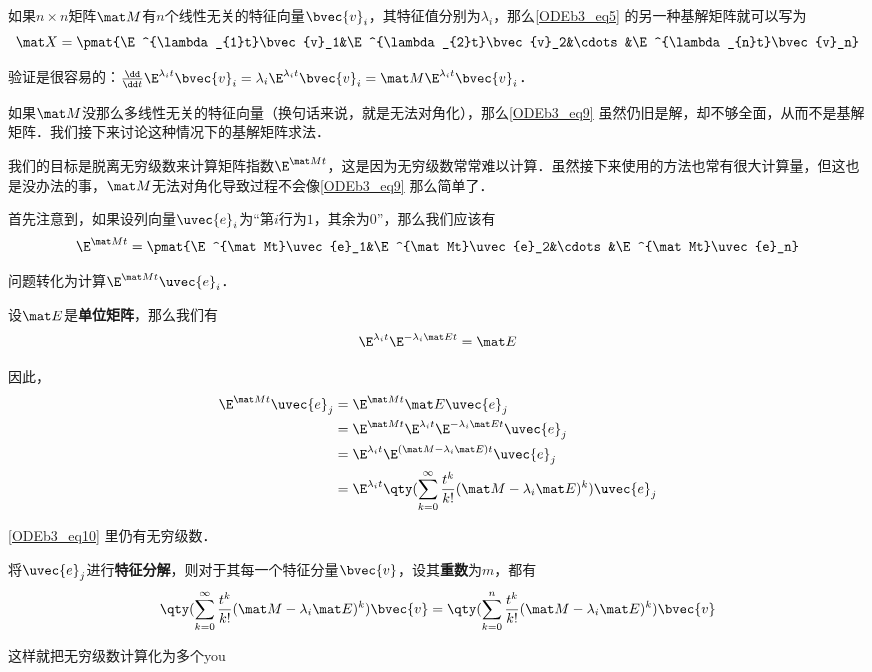 如果$n\times n$矩阵$\mat M$有$n$个线性无关的特征向量$\bvec{v}_i$，其特征值分别为$\lambda_i$，那么\autoref{ODEb3_eq5} 的另一种基解矩阵就可以写为
\begin{equation}\label{ODEb3_eq9}
\mat X=\pmat{\E^{\lambda_{1}t}\bvec{v}_1&\E^{\lambda_{2}t}\bvec{v}_2&\cdots&\E^{\lambda_{n}t}\bvec{v}_n}
\end{equation}

验证是很容易的：$\frac{\dd}{\dd t}\E^{\lambda_{i}t}\bvec{v}_i=\lambda_i\E^{\lambda_{i}t}\bvec{v}_i=\mat M\E^{\lambda_{i}t}\bvec{v}_i$．

如果$\mat M$没那么多线性无关的特征向量（换句话来说，就是无法对角化），那么\autoref{ODEb3_eq9} 虽然仍旧是解，却不够全面，从而不是基解矩阵．我们接下来讨论这种情况下的基解矩阵求法．

我们的目标是脱离无穷级数来计算矩阵指数$\E^{\mat Mt}$，这是因为无穷级数常常难以计算．虽然接下来使用的方法也常有很大计算量，但这也是没办法的事，$\mat M$无法对角化导致过程不会像\autoref{ODEb3_eq9} 那么简单了．

首先注意到，如果设列向量$\uvec{e}_i$为“第$i$行为$1$，其余为$0$”，那么我们应该有
\begin{equation}
\E^{\mat Mt}=\pmat{\E^{\mat Mt}\uvec{e}_1&\E^{\mat Mt}\uvec{e}_2&\cdots&\E^{\mat Mt}\uvec{e}_n}
\end{equation}

问题转化为计算$\E^{\mat Mt}\uvec{e}_i$．

设$\mat E$是\textbf{单位矩阵}，那么我们有
\begin{equation}
\E^{\lambda_it}\E^{-\lambda_i\mat Et}=\mat E
\end{equation}

因此，
\begin{equation}\label{ODEb3_eq10}
\begin{aligned}
\E^{\mat Mt}\uvec{e}_j&=\E^{\mat Mt}\mat E\uvec{e}_j\\
&=\E^{\mat Mt}\E^{\lambda_it}\E^{-\lambda_i\mat Et}\uvec{e}_j\\
&=\E^{\lambda_it}\E^{(\mat M-\lambda_i\mat E)t}\uvec{e}_j\\
&=\E^{\lambda_it}\qty(\sum_{k=0}^\infty \frac{t^k}{k!}(\mat M-\lambda_i\mat E)^k)\uvec{e}_j
\end{aligned}
\end{equation}

\autoref{ODEb3_eq10} 里仍有无穷级数．

将$\uvec{e}_j$进行\textbf{特征分解}，则对于其每一个特征分量$\bvec{v}$，设其\textbf{重数}为$m$，都有
\begin{equation}
\qty(\sum_{k=0}^\infty \frac{t^k}{k!}(\mat M-\lambda_i\mat E)^k)\bvec{v}=\qty(\sum_{k=0}^n \frac{t^k}{k!}(\mat M-\lambda_i\mat E)^k)\bvec{v}
\end{equation}

这样就把无穷级数计算化为多个you











